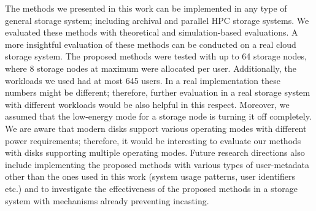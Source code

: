 The methods we presented in this work can be implemented in any type of general
storage system; including archival and parallel HPC storage systems. We evaluated
these methods with theoretical and simulation-based evaluations. A more insightful
evaluation of these methods can be conducted on a real cloud storage system. The
proposed methods were tested with up to 64 storage nodes, where 8 storage nodes at
maximum were allocated per user. Additionally, the workloads we used had at most
645 users. In a real implementation these numbers might be different; therefore,
further evaluation in a real storage system with different workloads would be also
helpful in this respect. Moreover, we assumed that the low-energy mode for a
storage node is turning it off completely. We are aware that modern disks support
various operating modes with different power requirements; therefore, it would be
interesting to evaluate our methods with disks supporting multiple operating modes.
Future research directions also include implementing the proposed methods with various
types of user-metadata other than the ones used in this work (system usage patterns,
user identifiers etc.) and to investigate the effectiveness of the proposed methods
in a storage system with mechanisms already preventing incasting.

